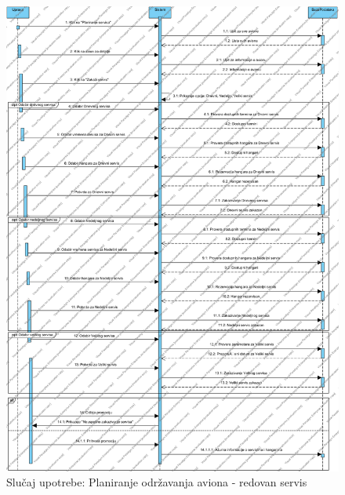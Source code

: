 \documentclass[a4paper]{article}
\begin{document}
\begin{figure}[H]
\begin{center}
\includegraphics[scale=0.55, width = 1.1\textwidth]{Dijagrami/Dijagrami_sekvence/Dijagram_sekvence_redovnog_servisa.png}
\end{center}
\caption{Slučaj upotrebe: Planiranje održavanja aviona - redovan servis}
\label{fig:ds_redovan_servis}
\end{figure}
\end{document}
